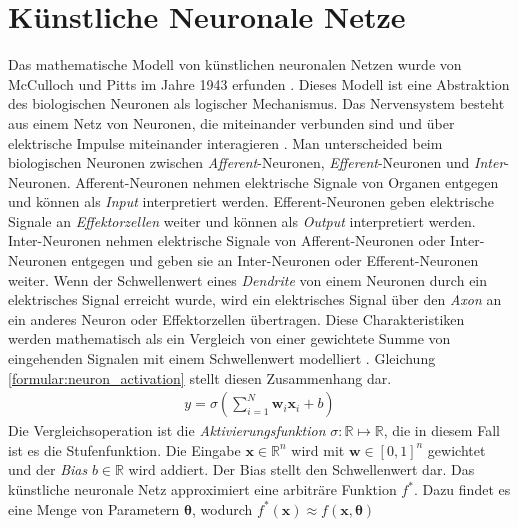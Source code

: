 \chapter{Künstliche Neuronale Netze}
Das mathematische Modell von künstlichen neuronalen Netzen wurde von McCulloch und Pitts im Jahre 1943 erfunden \cite{mcculloch1943logical}.
Dieses Modell ist eine Abstraktion des biologischen Neuronen als logischer Mechanismus.
\newline
\newline
Das Nervensystem besteht aus einem Netz von Neuronen, die miteinander verbunden sind und über elektrische Impulse miteinander interagieren \cite{rosenblatt1961principles}.
Man unterscheided beim biologischen Neuronen zwischen \textit{Afferent}-Neuronen, \textit{Efferent}-Neuronen und \textit{Inter}-Neuronen.
Afferent-Neuronen nehmen elektrische Signale von Organen entgegen und können als \textit{Input} interpretiert werden.
Efferent-Neuronen geben elektrische Signale an \textit{Effektorzellen} weiter und können als \textit{Output} interpretiert werden.
Inter-Neuronen nehmen elektrische Signale von Afferent-Neuronen oder Inter-Neuronen entgegen und geben sie an Inter-Neuronen oder Efferent-Neuronen weiter.
Wenn der Schwellenwert eines \textit{Dendrite} von einem Neuronen durch ein elektrisches Signal erreicht wurde, wird ein elektrisches Signal über den \textit{Axon} an ein
anderes Neuron oder Effektorzellen übertragen.
\newline
\newline
Diese Charakteristiken werden mathematisch als ein Vergleich von einer gewichtete Summe von eingehenden Signalen mit einem Schwellenwert modelliert \cite{higham2019deep}.
Gleichung \ref{formular:neuron_activation} stellt diesen Zusammenhang dar.
\begin{align}
    \label{formular:neuron_activation}
    y = \sigma(\sum_{i=1}^N\textbf{w}_i\textbf{x}_i + b)
\end{align}
Die Vergleichsoperation ist die \textit{Aktivierungsfunktion} $\sigma: \mathbb{R}\mapsto\mathbb{R}$, die in diesem Fall ist es die Stufenfunktion.
Die Eingabe $\textbf{x}\in\mathbb{R}^n$ wird mit $\textbf{w}\in[0, 1]^n$ gewichtet und der \textit{Bias} $b\in\mathbb{R}$ wird addiert. Der Bias stellt den Schwellenwert dar.
\newline
\newline
Das künstliche neuronale Netz approximiert eine arbiträre Funktion $f^*$. Dazu findet es eine Menge von Parametern $\boldsymbol\theta$, wodurch $f^*(\textbf{x})\approx f(\textbf{x}, \boldsymbol\theta)$
